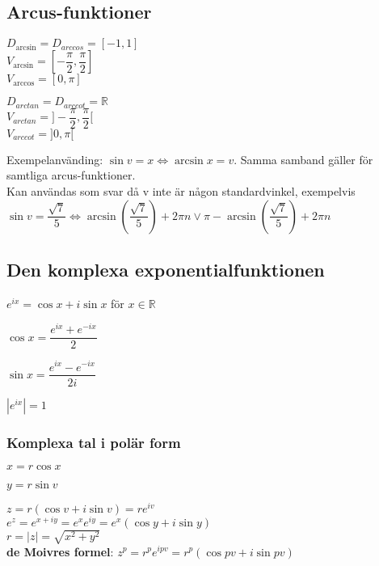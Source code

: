\documentclass{article}
\begin{document}
\begin{doublespace}
\subsection{Arcus-funktioner}
\begin{minipage}[t]{0.5\textwidth}
$D_{\arcsin} = D_{arccos} = [-1,1]$\\
$V_{\arcsin} = [-\dfrac{\pi}{2}, \dfrac{\pi}{2}]$\\
$V_{\arccos} = [0, \pi]$\\
\end{minipage}
\begin{minipage}[t]{0.5\textwidth}
$D_{arctan} = D_{arccot} = \mathbb{R}$\\
$V_{arctan} = ]-\dfrac{\pi}{2}, \dfrac{\pi}{2}[$\\
$V_{arccot} = ]0,\pi[$\\
\end{minipage}
Exempelanvänding: $\sin v = x \Leftrightarrow \arcsin x = v$. Samma samband gäller för samtliga arcus-funktioner.\\
Kan användas som svar då v inte är någon standardvinkel, exempelvis $\sin v = \dfrac{\sqrt{7}}{5} \Leftrightarrow \arcsin (\dfrac{\sqrt{7}}{5}) + 2\pi n \lor \pi -  \arcsin(\dfrac{\sqrt{7}}{5}) + 2\pi n$
\end{doublespace}
\subsection{Den komplexa exponentialfunktionen}
\begin{doublespace}
$e^{ix} = \cos x + i \sin x$ för $x \in \mathbb{R}$\\
\begin{minipage}[t]{0.5\textwidth}
$\cos x = \dfrac{e^{ix} + e^{-ix}}{2}$\\
\end{minipage}
\begin{minipage}[t]{0.5\textwidth}
$\sin x = \dfrac{e^{ix} - e^{-ix}}{2i}$\\
\end{minipage}
$|e^{ix}| = 1$
\subsubsection{Komplexa tal i polär form}
\begin{minipage}[t]{0.5\textwidth}
$x = r \cos x$
\end{minipage}
\begin{minipage}[t]{0.5\textwidth}
$y = r \sin v$
\end{minipage}
$z = r(\cos v + i \sin v) = re^{iv}$\\
$e^z = e^{x + iy} = e^xe^{iy} = e^x(\cos y + i\sin y)$\\
$r = |z| = \sqrt{x^2 + y^2}$\\
\textbf{de Moivres formel}: $z^p = r^pe^{ipv} = r^p(\cos pv + i\sin pv)$
\end{doublespace}
\end{document}
